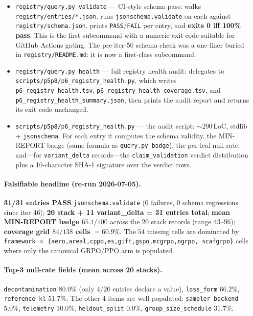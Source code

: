 \documentclass{article}
\begin{document}
\begin{itemize}
\item \texttt{registry/query.py validate} --- CI-style schema pass:
walks \texttt{registry/entries/*.json}, runs
\texttt{jsonschema.validate} on each against \texttt{registry/schema.json},
prints \texttt{PASS}/\texttt{FAIL} per entry, and \textbf{exits 0 iff
100\% pass}. This is the first subcommand with a numeric exit code
suitable for GitHub Actions gating. The pre-iter-50 schema check was
a one-liner buried in \texttt{registry/README.md}; it is now a
first-class subcommand.
\item \texttt{registry/query.py health} --- full registry health
audit: delegates to \texttt{scripts/p5p8/p6\_registry\_health.py},
which writes \texttt{p6\_registry\_health.tsv},
\texttt{p6\_registry\_health\_coverage.tsv}, and
\texttt{p6\_registry\_health\_summary.json}, then prints the audit
report and returns its exit code unchanged.
\item \texttt{scripts/p5p8/p6\_registry\_health.py} --- the audit
script: $\sim$290\,LoC, stdlib + \texttt{jsonschema}. For each entry
it computes the schema validity, the MIN-REPORT badge (same formula
as \texttt{query.py badge}), the per-leaf null-rate, and---for
\texttt{variant\_delta} records---the \texttt{claim\_validation}
verdict distribution plus a 10-character SHA-1 signature over the
verdict rows.
\end{itemize}

\paragraph{Falsifiable headline (re-run 2026-07-05).}
\textbf{31/31 entries PASS} \texttt{jsonschema.validate}
(0 failures, 0 schema regressions since iter 46);
\textbf{20 stack + 11 variant\_delta = 31 entries total};
\textbf{mean MIN-REPORT badge $65.1/100$} across the 20 stack records
(range $43$--$96$);
\textbf{coverage grid $84/138$ cells $=60.9\%$}.
The $54$ missing cells are dominated by
\texttt{framework $\times$ \{aero,areal,cppo,es,gift,gspo,mcgrpo,ngrpo,
scafgrpo\}} cells where only the canonical GRPO/PPO arm is populated.

\paragraph{Top-3 null-rate fields (mean across 20 stacks).}
\texttt{decontamination} $80.0\%$ (only $4/20$ entries declare a
value), \texttt{loss\_form} $66.2\%$, \texttt{reference\_kl} $51.7\%$.
The other 4 items are well-populated:
\texttt{sampler\_backend} $5.0\%$, \texttt{telemetry} $10.0\%$,
\texttt{heldout\_split} $0.0\%$, \texttt{group\_size\_schedule}
$31.7\%$.
\end{document}
